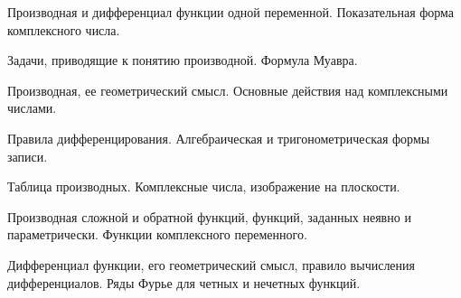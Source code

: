 \documentclass[
	14pt,
	a4paper,
	]
	{scrartcl}
\begin{document}
\vfill

\newpage


\shapk
{}
\setcounter{zad}{0}

\vfill
\z Производная и дифференциал функции одной переменной.
 \vfill
\z Показательная форма комплексного числа.
 \vfill

\vfill

\newpage


\shapk
{}
\setcounter{zad}{0}

\vfill
\z Задачи, приводящие к понятию производной.
 \vfill
\z Формула Муавра.
 \vfill

\vfill

\newpage


\shapk
{}
\setcounter{zad}{0}

\vfill
\z Производная, ее геометрический смысл.
 \vfill
\z Основные действия над комплексными числами.
 \vfill

\vfill

\newpage


\shapk
{}
\setcounter{zad}{0}

\vfill
\z Правила дифференцирования.
 \vfill
\z Алгебраическая и тригонометрическая формы записи.
 \vfill

\vfill

\newpage


\shapk
{}
\setcounter{zad}{0}

\vfill
\z Таблица производных.
 \vfill
\z Комплексные числа, изображение на плоскости.
 \vfill

\vfill

\newpage


\shapk
{}
\setcounter{zad}{0}

\vfill
\z Производная сложной и обратной функций, функций, заданных неявно и параметрически.
 \vfill
\z Функции комплексного переменного.
 \vfill

\vfill

\newpage


\shapk
{}
\setcounter{zad}{0}

\vfill
\z Дифференциал функции, его геометрический смысл, правило вычисления дифференциалов.
 \vfill
\z Ряды Фурье для четных и нечетных функций.
 \vfill

\vfill

\newpage


\shapk
{}
\setcounter{zad}{0}
\end{document}
